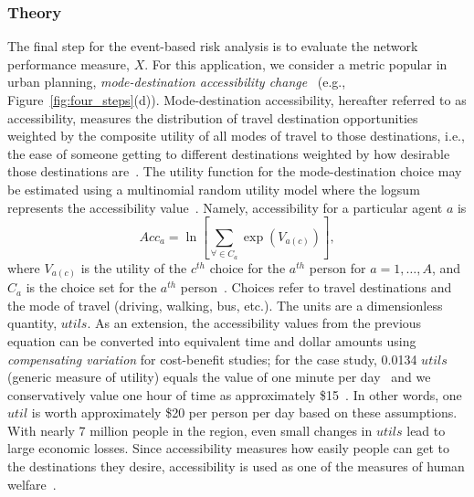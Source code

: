 \subsubsection{Theory}
The final step for the event-based risk analysis is to evaluate the network performance measure, $X$. For this application, we consider a metric popular in urban planning, \emph{mode-destination accessibility change}~\cite[e.g.,][]{geurs_accessibility_2004,kockelman_travel_1997,waddell_incorporating_2002}  (e.g., Figure~\ref{fig:four_steps}{(d)}). Mode-destination accessibility, hereafter referred to as accessibility, measures the distribution of travel destination opportunities weighted by the composite utility of all modes of travel to those destinations, i.e., the ease of someone getting to different destinations weighted by how desirable those destinations are~\cite{handy_measuring_1997,niemeier_accessibility:_1997}. The utility function for the mode-destination choice may be estimated using a multinomial random utility model where the logsum represents the accessibility value~\cite{manski_structural_1981,handy_measuring_1997,niemeier_accessibility:_1997}. Namely, accessibility for a particular agent $a$ is
\begin{equation}
Acc_a = \ln \left[ \sum_{\forall \in C_a} \exp (V_{a(c)}) \right],
\label{eq:acc}
\end{equation}
where $V_{a(c)}$ is the utility of the $c^{th}$ choice for the $a^{th}$ person for $a = 1, \ldots, A$, and $C_a$ is the choice set for the $a^{th}$ person~\cite{handy_measuring_1997}. Choices refer to travel destinations and the mode of travel (driving, walking, bus, etc.). The units are a dimensionless quantity, $utils$. As an extension, the accessibility values from the previous equation can be converted into equivalent time and dollar amounts using \emph{compensating variation} for cost-benefit studies; for the case study, 0.0134 $utils$ (generic measure of utility) equals the value of one minute per day~\cite{niemeier_accessibility:_1997,small_applied_1981,ory_personal_2013} and we conservatively value one hour of time as approximately \$15~\cite{united_states_department_of_transportation_revised_2011}. In other words, one $util$ is worth approximately \$20 per person per day based on these assumptions. With nearly 7 million people in the region, even small changes in $utils$ lead to large economic losses. Since accessibility measures how easily people can get to the destinations they desire, accessibility is used as one of the measures of human welfare~\cite[e.g.,][]{niemeier_accessibility:_1997}.

